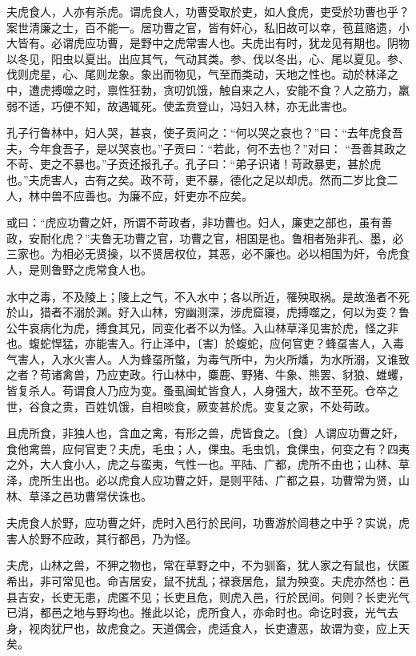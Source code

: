 \documentclass[]{article}
\begin{document}
夫虎食人，人亦有杀虎。谓虎食人，功曹受取於吏，如人食虎，吏受於功曹也乎？案世清廉之士，百不能一。居功曹之官，皆有奸心，私旧故可以幸，苞苴赂遗，小大皆有。必谓虎应功曹，是野中之虎常害人也。夫虎出有时，犹龙见有期也。阴物以冬见，阳虫以夏出。出应其气，气动其类。参、伐以冬出，心、尾以夏见。参、伐则虎星，心、尾则龙象。象出而物见，气至而类动，天地之性也。动於林泽之中，遭虎搏噬之时，禀性狂勃，贪叨饥饿，触自来之人，安能不食？人之筋力，羸弱不适，巧便不知，故遇辄死。使孟贲登山，冯妇入林，亦无此害也。

孔子行鲁林中，妇人哭，甚哀，使子贡问之：``何以哭之哀也？''曰：``去年虎食吾夫，今年食吾子，是以哭哀也。''子贡曰：``若此，何不去也？''对曰：
``吾善其政之不苛、吏之不暴也。''子贡还报孔子。孔子曰：``弟子识诸！苛政暴吏，甚於虎也。''夫虎害人，古有之矣。政不苛，吏不暴，德化之足以却虎。然而二岁比食二人，林中兽不应善也。为廉不应，奸吏亦不应矣。

或曰：``虎应功曹之奸，所谓不苛政者，非功曹也。妇人，廉吏之部也，虽有善政，安耐化虎？''夫鲁无功曹之官，功曹之官，相国是也。鲁相者殆非孔、墨，必三家也。为相必无贤操，以不贤居权位，其恶，必不廉也。必以相国为奸，令虎食人，是则鲁野之虎常食人也。

水中之毒，不及陵上；陵上之气，不入水中；各以所近，罹殃取祸。是故渔者不死於山，猎者不溺於渊。好入山林，穷幽测深，涉虎窟寝，虎搏噬之，何以为变？鲁公牛哀病化为虎，搏食其兄，同变化者不以为怪。入山林草泽见害於虎，怪之非也。蝮蛇悍猛，亦能害入。行止泽中，〔害〕於蝮蛇，应何官吏？蜂虿害人，入毒气害人，入水火害人。人为蜂虿所螫，为毒气所中，为火所燔，为水所溺，又谁致之者？苟诸禽兽，乃应吏政。行山林中，麋鹿、野猪、牛象、熊罢、豺狼、蜼蠼，皆复杀人。苟谓食人乃应为变。蚤虱闽虻皆食人，人身强大，故不至死。仓卒之世，谷食之贵，百姓饥饿，自相啖食，厥变甚於虎。变复之家，不处苟政。

且虎所食，非独人也，含血之禽，有形之兽，虎皆食之。〔食〕人谓应功曹之奸，食他禽兽，应何官吏？夫虎，毛虫；人，倮虫。毛虫饥，食倮虫，何变之有？四夷之外，大人食小人，虎之与蛮夷，气性一也。平陆、广都，虎所不由也；山林、草泽，虎所生出也。必以虎食人应功曹之奸，是则平陆、广都之县，功曹常为贤，山林、草泽之邑功曹常伏诛也。

夫虎食人於野，应功曹之奸，虎时入邑行於民间，功曹游於闾巷之中乎？实说，虎害人於野不应政，其行都邑，乃为怪。

夫虎，山林之兽，不狎之物也，常在草野之中，不为驯畜，犹人家之有鼠也，伏匿希出，非可常见也。命吉居安，鼠不扰乱；禄衰居危，鼠为殃变。夫虎亦然也：邑县吉安，长吏无患，虎匿不见；长吏且危，则虎入邑，行於民间。何则？长吏光气已消，都邑之地与野均也。推此以论，虎所食人，亦命时也。命讫时衰，光气去身，视肉犹尸也，故虎食之。天道偶会，虎适食人，长吏遭恶，故谓为变，应上天矣。
\end{document}
